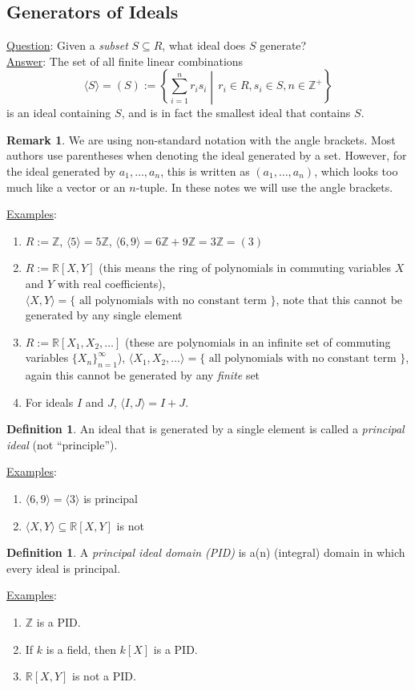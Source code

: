 \documentclass[12pt]{article}
\newcommand{\z}{\mathbb{Z}}
\newcommand{\real}{\mathbb{R}}
\newcommand{\ita}[1]{\textit{#1}}
\newcommand{\vbrack}[1]{\langle #1\rangle}
\theoremstyle{definition}
\newtheorem{definition}[theorem]{Definition}
\newtheorem*{remark}{Remark}
\begin{document}
\subsection{Generators of Ideals}
\underline{Question}: Given a \ita{subset} $S\subseteq R$, what ideal does $S$ generate?\\
\underline{Answer}: The set of all finite linear combinations
\begin{equation}
    \vbrack{S}=(S):=\left\{\sum\limits_{i=1}^nr_is_i\middle| \,r_i\in R,s_i\in S,n\in\z^+\right\}
\end{equation}
is an ideal containing $S$, and is in fact the smallest ideal that contains $S$.
\begin{remark}
    We are using non-standard notation with the angle brackets. Most authors use parentheses when denoting the ideal generated by a set. However, for the ideal generated by $a_1,\dotsc,a_n$, this is written as $(a_1,\dotsc,a_n)$, which looks too much like a vector or an $n$-tuple. In these notes we will use the angle brackets. 
\end{remark}
\underline{Examples}:
\begin{enumerate}
    \item $R:=\z$, $\vbrack{5}=5\z$, $\vbrack{6,9}=6\z+9\z=3\z=(3)$
    \item $R:=\real[X,Y]$ (this means the ring of polynomials in commuting variables $X$ and $Y$ with real coefficients), $\vbrack{X,Y}=\{\text{ all polynomials with no constant term }\}$, note that this cannot be generated by any single element
    \item $R:=\real[X_1,X_2,\dotsc]$ (these are polynomials in an infinite set of commuting variables $\{X_n\}_{n=1}^{\infty}$), $\vbrack{X_1,X_2,\dotsc}=\{\text{ all polynomials with no constant term }\}$, again this cannot be generated by any \ita{finite} set
    \item For ideals $I$ and $J$, $\vbrack{I,J}=I+J$.
\end{enumerate}
\begin{definition}
    An ideal that is generated by a single element is called a \ita{principal ideal} (not ``principle'').
\end{definition}
\underline{Examples}:
\begin{enumerate}
    \item $\vbrack{6,9}=\vbrack{3}$ is principal
    \item $\vbrack{X,Y}\subseteq\real[X,Y]$ is not
\end{enumerate}
\begin{definition}
    A \ita{principal ideal domain (PID)} is a(n) (integral) domain in which every ideal is principal.
\end{definition}
\underline{Examples}:
\begin{enumerate}
    \item $\z$ is a PID.
    \item If $k$ is a field, then $k[X]$ is a PID.
    \item $\real[X,Y]$ is not a PID.
\end{enumerate}
\end{document}
